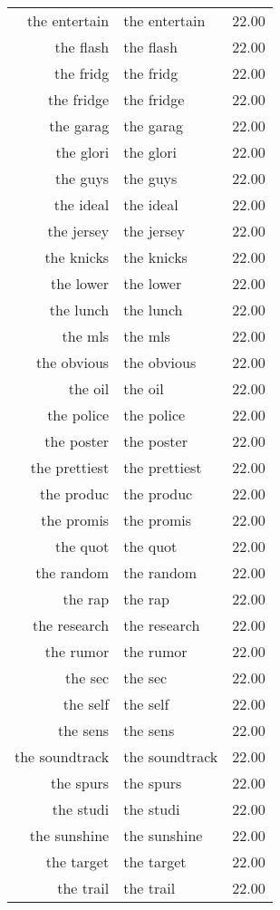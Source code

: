 \begin{table}[ht]
\begin{tabular}{rlr}
  the entertain & the entertain & 22.00 \\ 
  the flash & the flash & 22.00 \\ 
  the fridg & the fridg & 22.00 \\ 
  the fridge & the fridge & 22.00 \\ 
  the garag & the garag & 22.00 \\ 
  the glori & the glori & 22.00 \\ 
  the guys & the guys & 22.00 \\ 
  the ideal & the ideal & 22.00 \\ 
  the jersey & the jersey & 22.00 \\ 
  the knicks & the knicks & 22.00 \\ 
  the lower & the lower & 22.00 \\ 
  the lunch & the lunch & 22.00 \\ 
  the mls & the mls & 22.00 \\ 
  the obvious & the obvious & 22.00 \\ 
  the oil & the oil & 22.00 \\ 
  the police & the police & 22.00 \\ 
  the poster & the poster & 22.00 \\ 
  the prettiest & the prettiest & 22.00 \\ 
  the produc & the produc & 22.00 \\ 
  the promis & the promis & 22.00 \\ 
  the quot & the quot & 22.00 \\ 
  the random & the random & 22.00 \\ 
  the rap & the rap & 22.00 \\ 
  the research & the research & 22.00 \\ 
  the rumor & the rumor & 22.00 \\ 
  the sec & the sec & 22.00 \\ 
  the self & the self & 22.00 \\ 
  the sens & the sens & 22.00 \\ 
  the soundtrack & the soundtrack & 22.00 \\ 
  the spurs & the spurs & 22.00 \\ 
  the studi & the studi & 22.00 \\ 
  the sunshine & the sunshine & 22.00 \\ 
  the target & the target & 22.00 \\ 
  the trail & the trail & 22.00 \\ 

\end{tabular}
\end{table}
